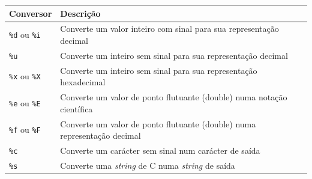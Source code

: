 \documentclass[
]{article}
\begin{document}
\begin{longtable}[]{@{}ll@{}}
\toprule
\begin{minipage}[b]{0.14\columnwidth}\raggedright
Conversor\strut
\end{minipage} & \begin{minipage}[b]{0.80\columnwidth}\raggedright
Descrição\strut
\end{minipage}\tabularnewline
\midrule
\endhead
\begin{minipage}[t]{0.14\columnwidth}\raggedright
\texttt{\%d} ou \texttt{\%i}\strut
\end{minipage} & \begin{minipage}[t]{0.80\columnwidth}\raggedright
Converte um valor inteiro com sinal para sua representação decimal\strut
\end{minipage}\tabularnewline
\begin{minipage}[t]{0.14\columnwidth}\raggedright
\texttt{\%u}\strut
\end{minipage} & \begin{minipage}[t]{0.80\columnwidth}\raggedright
Converte um inteiro sem sinal para sua representação decimal\strut
\end{minipage}\tabularnewline
\begin{minipage}[t]{0.14\columnwidth}\raggedright
\texttt{\%x} ou \texttt{\%X}\strut
\end{minipage} & \begin{minipage}[t]{0.80\columnwidth}\raggedright
Converte um inteiro sem sinal para sua representação hexadecimal\strut
\end{minipage}\tabularnewline
\begin{minipage}[t]{0.14\columnwidth}\raggedright
\texttt{\%e} ou \texttt{\%E}\strut
\end{minipage} & \begin{minipage}[t]{0.80\columnwidth}\raggedright
Converte um valor de ponto flutuante (double) numa notação
científica\strut
\end{minipage}\tabularnewline
\begin{minipage}[t]{0.14\columnwidth}\raggedright
\texttt{\%f} ou \texttt{\%F}\strut
\end{minipage} & \begin{minipage}[t]{0.80\columnwidth}\raggedright
Converte um valor de ponto flutuante (double) numa representação
decimal\strut
\end{minipage}\tabularnewline
\begin{minipage}[t]{0.14\columnwidth}\raggedright
\texttt{\%c}\strut
\end{minipage} & \begin{minipage}[t]{0.80\columnwidth}\raggedright
Converte um carácter sem sinal num carácter de saída\strut
\end{minipage}\tabularnewline
\begin{minipage}[t]{0.14\columnwidth}\raggedright
\texttt{\%s}\strut
\end{minipage} & \begin{minipage}[t]{0.80\columnwidth}\raggedright
Converte uma \emph{string} de C numa \emph{string} de saída\strut
\end{minipage}\tabularnewline
\bottomrule
\end{longtable}
\end{document}
